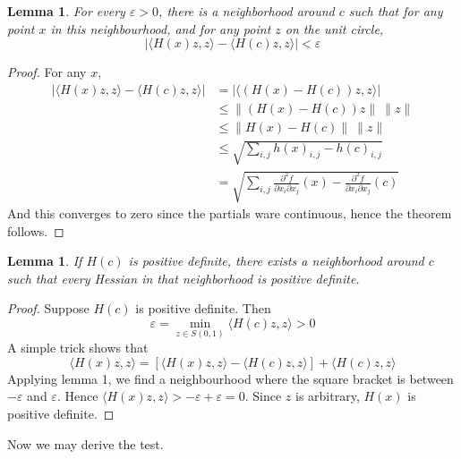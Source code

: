 \documentclass[12pt]{amsbook}
\theoremstyle{plain}
\newtheorem{lemma}[theorem]{Lemma}
\theoremstyle{definition}
\begin{document}
\begin{lemma}
    For every $\varepsilon > 0$, there is a neighborhood around $c$ such that for any point $x$ in this neighbourhood, and for any point $z$ on the unit circle,
    \[ | \langle H(x)z,z \rangle - \langle H(c)z, z \rangle| < \varepsilon \]
\end{lemma}
%
\begin{proof}
    For any $x$,
    \begin{align*}
        |\langle H(x)z, z \rangle - \langle H(c)z, z \rangle | &= | \langle (H(x) - H(c))z, z \rangle |\\
        &\leq  \| (H(x) - H(c)) z \|\ \| z \|\\
        &\leq \|H(x) - H(c)\|\ \|z\|\\
        &\leq \sqrt{ \sum_{i,j} h(x)_{i,j} - h(c)_{i,j}}\\
        &= \sqrt{ \sum_{i,j} \frac{\partial^2 f}{\partial x_i \partial x_j} (x) - \frac{\partial^2 f}{\partial x_i \partial x_j} (c) }
    \end{align*}
    And this converges to zero since the partials ware continuous, hence the theorem follows.
\end{proof}

\begin{lemma}
    If $H(c)$ is positive definite, there exists a neighborhood around $c$ such that every Hessian in that neighborhood is positive definite.
\end{lemma}
%
\begin{proof}
    Suppose $H(c)$ is positive definite. Then 
    \[ \varepsilon = \min_{z \in S(0,1)} \langle H(c)z, z \rangle > 0 \]
    A simple trick shows that
    \[ \langle H(x)z, z \rangle = [\langle H(x)z, z \rangle - \langle H(c)z, z \rangle] + \langle H(c)z, z \rangle \]
    Applying lemma 1, we find a neighbourhood where the square bracket is between $-\varepsilon$ and $\varepsilon$. Hence $\langle H(x)z, z \rangle > -\varepsilon + \varepsilon = 0$. Since $z$ is arbitrary, $H(x)$ is positive definite.
\end{proof}

Now we may derive the test.
\end{document}
